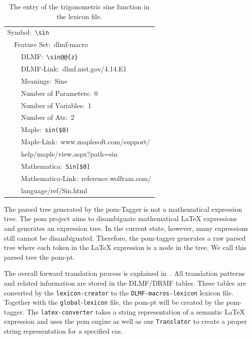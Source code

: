 \documentclass[a4paper,11pt]{article}
\theoremstyle{defTheoStyle}
\theoremstyle{defExampStyle}
\begin{document}
	\begin{table}[ht!]
		\centering
		\begin{tabular}{lll}
			\hline
			\multicolumn{3}{l}{Symbol:~\texttt{\textbackslash sin}} \\
			\! & \multicolumn{2}{l}{Feature Set:~dlmf-macro} \\
			\! & \! & DLMF:~\verb|\sin@@{z}|\\
			\! & \! & DLMF-Link:~dlmf.nist.gov/4.14.E1\\
			\! & \! & Meanings:~Sine\\
			\! & \! & Number of Parameters:~0\\
			\! & \! & Number of Variables:~1\\
			\! & \! & Number of Ats:~2\\
			\! & \! & Maple:~\verb|sin($0)|\\
			\! & \! & Maple-Link:~www.maplesoft.com/support/\\
			\! & \! & \hspace{32pt} help/maple/view.aspx?path=sin\\
			\! & \! & Mathematica:~\verb|Sin[$0]|\\
			\! & \! & Mathematica-Link:~reference.wolfram.com/\\
			\! & \! & \hspace{32pt} language/ref/Sin.html\\
			\hline
		\end{tabular}
		\caption{The entry of the trigonometric sine function in the lexicon file.}
		\label{tab:sine-lex-example}
	\end{table}
	
	The parsed tree generated by the \gls*{pom}-Tagger is not a mathematical expression tree. The \gls*{pom} project aims to disambiguate mathematical \LaTeX{} expressions and generates an expression tree. In the current state, however, many expressions still cannot be disambiguated. Therefore, the \gls*{pom}-tagger generates a raw parsed tree where each token in the \LaTeX{} expression is a node in the tree. We call this parsed tree the \gls*{pom-pt}.
	
	{\sloppy The overall forward translation process is explained in~. All translation patterns and related information are stored in the DLMF/DRMF tables. These tables are converted by the \verb|lexicon-creator| to the \verb|DLMF-macros-lexicon| lexicon file. Together with the \verb|global|-\verb|lexicon| file, the \gls*{pom-pt} will be created by the \gls*{pom}-tagger. The \verb|latex-converter| takes a string representation of a semantic \LaTeX{} expression and uses the \gls*{pom} engine as well as our \verb|Translator| to create a proper string representation for a specified \gls*{cas}.}
	
\end{document}
